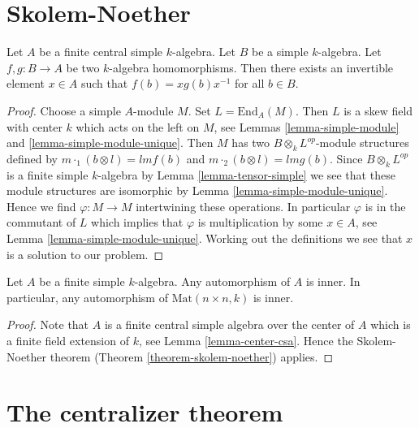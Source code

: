 \section{Skolem-Noether}
\label{section-skolem-noether}



\begin{theorem}
\label{theorem-skolem-noether}
Let $A$ be a finite central simple $k$-algebra. Let $B$ be a simple
$k$-algebra. Let $f, g : B \to A$ be two $k$-algebra homomorphisms.
Then there exists an invertible element $x \in A$ such that
$f(b) = xg(b)x^{-1}$ for all $b \in B$.
\end{theorem}

\begin{proof}
Choose a simple $A$-module $M$. Set $L = \text{End}_A(M)$.
Then $L$ is a skew field with center $k$ which acts on the left on $M$, see
Lemmas \ref{lemma-simple-module} and \ref{lemma-simple-module-unique}.
Then $M$ has two $B \otimes_k L^{op}$-module structures defined by
$m \cdot_1 (b \otimes l) = lmf(b)$ and $m \cdot_2 (b \otimes l) = lmg(b)$.
Since $B \otimes_k L^{op}$ is a finite simple $k$-algebra by
Lemma \ref{lemma-tensor-simple}
we see that these module structures are isomorphic by
Lemma \ref{lemma-simple-module-unique}.
Hence we find $\varphi : M \to M$ intertwining these operations.
In particular $\varphi$ is in the commutant of $L$ which implies that
$\varphi$ is multiplication by some $x \in A$, see
Lemma \ref{lemma-simple-module-unique}. Working out the definitions we see
that $x$ is a solution to our problem.
\end{proof}

\begin{lemma}
\label{lemma-automorphism-inner}
Let $A$ be a finite simple $k$-algebra. Any automorphism of $A$ is
inner. In particular, any automorphism of $\text{Mat}(n \times n, k)$
is inner.
\end{lemma}

\begin{proof}
Note that $A$ is a finite central simple algebra over the center
of $A$ which is a finite field extension of $k$, see
Lemma \ref{lemma-center-csa}.
Hence the Skolem-Noether theorem (Theorem \ref{theorem-skolem-noether})
applies.
\end{proof}



\section{The centralizer theorem}
\label{section-centralizer}


